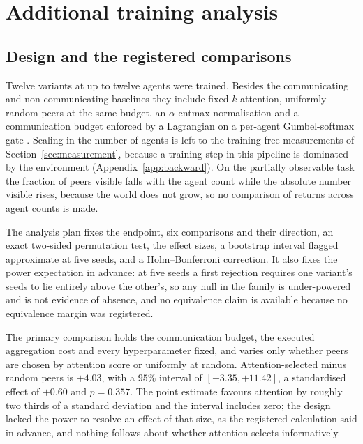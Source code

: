 \section{Additional training analysis}
\label{app:training}

\subsection{Design and the registered comparisons}
\label{app:design}

Twelve variants at up to twelve agents were trained. Besides the communicating
and non-communicating baselines they include fixed-$k$ attention, uniformly
random peers at the same budget, an $\alpha$-entmax normalisation
\citep{peters2019entmax} and a communication budget enforced by a Lagrangian
\citep{stooke2020pidlagrangian} on a per-agent Gumbel-softmax gate
\citep{jang2017gumbel}. Scaling in the number of agents is left to the
training-free measurements of Section~\ref{sec:measurement}, because a training
step in this pipeline is dominated by the environment
(Appendix~\ref{app:backward}). On the partially observable task the fraction of
peers visible falls with the agent count while the absolute number visible
rises, because the world does not grow, so no comparison of returns across agent
counts is made.

The analysis plan fixes the endpoint, six comparisons and their direction, an
exact two-sided permutation test, the effect sizes, a bootstrap interval flagged
approximate at five seeds, and a Holm--Bonferroni correction. It also fixes the
power expectation in advance: at five seeds a first rejection requires one
variant's seeds to lie entirely above the other's, so any null in the family is
under-powered and is not evidence of absence, and no equivalence claim is
available because no equivalence margin was registered.

The primary comparison holds the communication budget, the executed aggregation
cost and every hyperparameter fixed, and varies only whether peers are chosen by
attention score or uniformly at random. Attention-selected minus random peers is
$+4.03$, with a $95\%$ interval of $[-3.35, +11.42]$, a standardised effect of
$+0.60$ and $p = 0.357$. The point estimate favours attention by roughly two
thirds of a standard deviation and the interval includes zero; the design lacked
the power to resolve an effect of that size, as the registered calculation said
in advance, and nothing follows about whether attention selects informatively.

